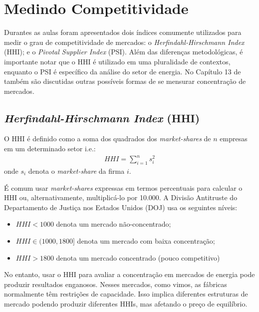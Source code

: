 \section{Medindo Competitividade}
Durantes as aulas foram apresentados dois índices comumente utilizados para medir o grau de competitividade de mercados: o \textit{Herfindahl-Hirschmann Index} (HHI); e o \textit{Pivotal Supplier Index} (PSI). Além das diferenças metodológicas, é importante notar que o HHI é utilizado em uma pluralidade de contextos, enquanto o PSI é específico da análise do setor de energia. No Capítulo 13 de \textcite{cretì_fontini_2019} também são discutidas outras possíveis formas de se mensurar concentração de mercados.

\subsection{\textit{Herfindahl-Hirschmann Index} (HHI)}
O HHI é definido como a soma dos quadrados dos \textit{market-shares} de $n$ empresas em um determinado setor i.e.:
\begin{align*}
    HHI=\sum_{i=1}^ns_i^2
\end{align*}
onde $s_i$ denota o \textit{market-share} da firma $i$.

É comum usar \textit{market-shares} expressas em termos percentuais para calcular o HHI ou, alternativamente, multiplicá-lo por 10.000. A Divisão Antitruste do Departamento de Justiça nos Estados Unidos (DOJ) usa os seguintes níveis:
\begin{itemize}
    \item $HHI<1000$ denota um mercado não-concentrado;
    \item $HHI\in(1000,1800]$ denota um mercado com baixa concentração;
    \item $HHI>1800$ denota um mercado concentrado (pouco competitivo)
\end{itemize}
No entanto, usar o HHI para avaliar a concentração em mercados de energia pode produzir resultados enganosos. Nesses mercados, como vimos, as fábricas normalmente têm restrições de capacidade. Isso implica diferentes estruturas de mercado podendo produzir diferentes
HHIs, mas afetando o preço de equilíbrio.

